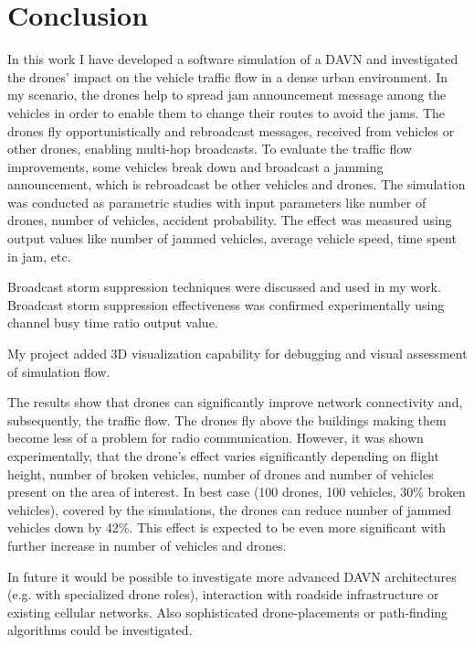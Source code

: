 \documentclass[]{nsm-thesis}
\begin{document}
\chapter{Conclusion}

In this work I have developed a software simulation of a \ac{DAVN} and investigated the drones' impact on the vehicle traffic flow in a dense urban environment. In my scenario, the drones help to spread jam announcement message among the vehicles in order to enable them to change their routes to avoid the jams. The drones fly opportunistically and rebroadcast messages, received from vehicles or other drones, enabling multi-hop broadcasts. To evaluate the traffic flow improvements, some vehicles break down and broadcast a jamming announcement, which is rebroadcast be other vehicles and drones. The simulation was conducted as parametric studies with input parameters like number of drones, number of vehicles, accident probability. The effect was measured using output values like number of jammed vehicles, average vehicle speed, time spent in jam, etc.

Broadcast storm suppression techniques were discussed and used in my work. Broadcast storm suppression effectiveness was confirmed experimentally using channel busy time ratio output value.

My project added 3D visualization capability for debugging and visual assessment of simulation flow.

The results show that drones can significantly improve network connectivity and, subsequently, the traffic flow. The drones fly above the buildings making them become less of a problem for radio communication. However, it was shown experimentally, that the drone's effect varies significantly depending on flight height, number of broken vehicles, number of drones and number of vehicles present on the area of interest. In best case (100 drones, 100 vehicles, 30\% broken vehicles), covered by the simulations, the drones can reduce number of jammed vehicles down by 42\%. This effect is expected to be even more significant with further increase in number of vehicles and drones.

In future it would be possible to investigate more advanced \ac{DAVN} architectures (e.g. with specialized drone roles), interaction with roadside infrastructure or existing cellular networks. Also sophisticated drone-placements or path-finding algorithms could be investigated.

\cleardoublepage

\listofabbreviations
\clearpage

\listoffigures
\clearpage

\listoftables
\clearpage

\printbibliography
\end{document}
